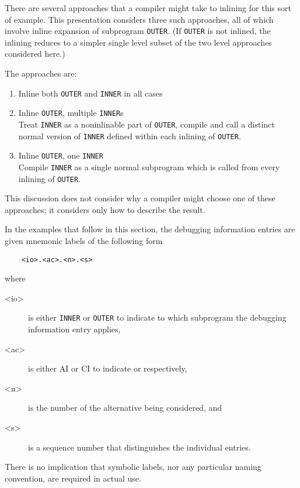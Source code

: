 There are several approaches that a compiler might take to
inlining for this sort of example. This presentation considers
three such approaches, all of which involve inline expansion
of subprogram \texttt{OUTER}. (If \texttt{OUTER} is not inlined, the inlining
reduces to a simpler single level subset of the two level
approaches considered here.)

The approaches are:
\begin{enumerate}[1. ]
\item  Inline both \texttt{OUTER} and \texttt{INNER} in all cases

\item Inline \texttt{OUTER}, multiple \texttt{INNER}s \\
Treat \texttt{INNER} as a non\dash inlinable part of \texttt{OUTER}, compile and
call a distinct normal version of \texttt{INNER} defined within each
inlining of \texttt{OUTER}.

\item Inline \texttt{OUTER}, one \texttt{INNER} \\
Compile \texttt{INNER} as a single normal subprogram which is called
from every inlining of \texttt{OUTER}.
\end{enumerate}

This discussion does not consider why a compiler might choose
one of these approaches; it considers only how to describe
the result.

In the examples that follow in this section, the debugging
information entries are given mnemonic labels of the following
form
\begin{verbatim}
    <io>.<ac>.<n>.<s>
\end{verbatim}
where
\begin{description}
\item[\textless io\textgreater]
is either \texttt{INNER} or \texttt{OUTER} to indicate to which
subprogram the debugging information entry applies, 
\item[\textless ac\textgreater]
is either AI or CI to indicate  or
 respectively, 
\item[\textless n\textgreater]
is the number of the
alternative being considered, and 
\item[\textless s\textgreater]
is a sequence number that
distinguishes the individual entries. 
\end{description}
There is no implication
that symbolic labels, nor any particular naming convention,
are required in actual use.

